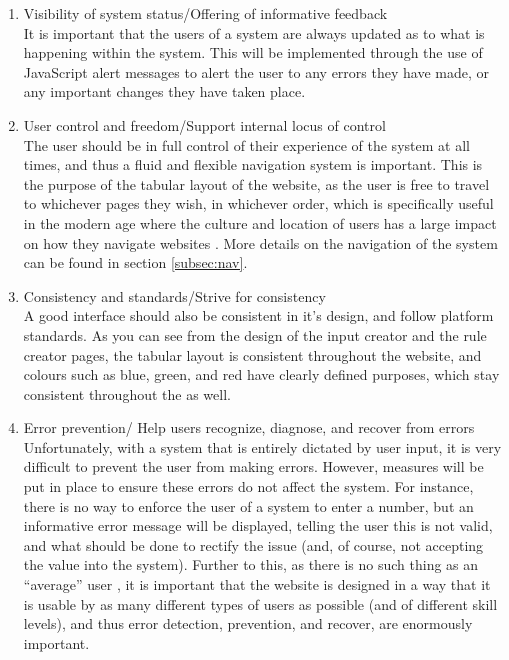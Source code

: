 \begin{enumerate}
\item Visibility of system status/Offering of informative feedback\\
It is important that the users of a system are always updated as to what is happening within the system. This will be implemented through the use of JavaScript alert messages to alert the user to any errors they have made, or any important changes they have taken place.

\item User control and freedom/Support internal locus of control\\
The user should be in full control of their experience of the system at all times, and thus a fluid and flexible navigation system is important. This is the purpose of the tabular layout of the website, as the user is free to travel to whichever pages they wish, in whichever order, which is specifically useful in the modern age where the culture and location of users has a large impact on how they navigate websites \cite{kralisch2005impact}. More details on the navigation of the system can be found in section \ref{subsec:nav}. 

\item Consistency and standards/Strive for consistency\\
A good interface should also be consistent in it's design, and follow platform standards. As you can see from the design of the input creator and the rule creator pages, the tabular layout is consistent throughout the website, and colours such as blue, green, and red have clearly defined purposes, which stay consistent throughout the as well.

\item Error prevention/ Help users recognize, diagnose, and recover from errors\\
Unfortunately, with a system that is entirely dictated by user input, it is very difficult to prevent the user from making errors. However, measures will be put in place to ensure these errors do not affect the system. For instance, there is no way to enforce the user of a system to enter a number, but an informative error message will be displayed, telling the user this is not valid, and what should be done to rectify the issue (and, of course, not accepting the value into the system). Further to this, as there is no such thing as an ``average'' user \cite{partarakis2009user}, it is important that the website is designed in a way that it is usable by as many different types of users as possible (and of different skill levels), and thus error detection, prevention, and recover, are enormously important.


\end{enumerate}
